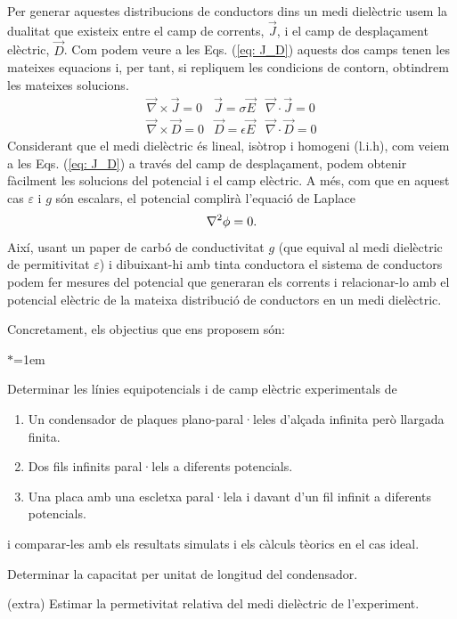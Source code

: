 \documentclass[11pt]{article}
\begin{document}
Per generar aquestes distribucions de conductors dins un medi dielèctric usem la dualitat que existeix entre el camp de corrents, $\vec{J}$, i el camp de desplaçament elèctric, $\vec{D}$. Com podem veure a les Eqs. (\ref{eq: J_D}) aquests dos camps tenen les mateixes equacions i, per tant, si repliquem les condicions de contorn, obtindrem les mateixes solucions.
\begin{equation}
    \begin{array}{lll}
    \vec{\nabla} \times \vec{J}=0 & \vec{J}=\sigma \vec{E} & \vec{\nabla} \cdot \vec{J}=0 \\
    \vec{\nabla} \times \vec{D}=0 & \vec{D}=\epsilon \vec{E} & \vec{\nabla} \cdot \vec{D}=0
    \end{array}
    \label{eq: J_D}
\end{equation}
Considerant que el medi dielèctric és lineal, isòtrop i homogeni (l.i.h), com veiem a les Eqs. (\ref{eq: J_D}) a través del camp de desplaçament, podem obtenir fàcilment les solucions del potencial i el camp elèctric. A més, com que en aquest cas $\varepsilon$ i $g$ són escalars, el potencial complirà l'equació de Laplace
\begin{equation}
    \laplacian{\phi}=0.
\end{equation}
Així, usant un paper de carbó de conductivitat $g$ (que equival al medi dielèctric de permitivitat $\varepsilon$) i dibuixant-hi amb tinta conductora el sistema de conductors podem fer mesures del potencial que generaran els corrents i relacionar-lo amb el potencial elèctric de la mateixa distribució de conductors en un medi dielèctric.

Concretament, els objectius que ens proposem són:
\begin{list}{$\ast$}{\leftmargin=1em}
    \item Determinar les línies equipotencials i de camp elèctric experimentals de
        \begin{enumerate}{\leftmargin=1em}
            \item  Un condensador de plaques plano-paral·leles d'alçada infinita però llargada finita.
            \item  Dos fils infinits paral·lels a diferents potencials.
            \item  Una placa amb una escletxa paral·lela i davant d'un fil infinit a diferents potencials.
        \end{enumerate}  
        i comparar-les amb els resultats simulats i els càlculs tèorics en el cas ideal.
    \item Determinar la capacitat per unitat de longitud del condensador.
    \item (extra) Estimar la permetivitat relativa del medi dielèctric de l'experiment.
\end{list}
\end{document}

